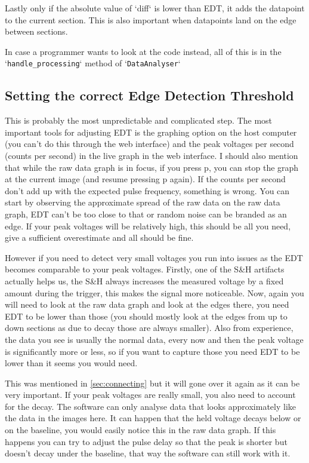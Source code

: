 \documentclass[a4paper, 10pt]{article}
\begin{document}
Lastly only if the absolute value of `diff` is lower than EDT, it adds the datapoint to the current section.
This is also important when datapoints land on the edge between sections.

In case a programmer wants to look at the code instead, all of this is in the `\lstinline{handle_processing}` method of `\lstinline{DataAnalyser}`

\subsection{Setting the correct Edge Detection Threshold}
This is probably the most unpredictable and complicated step.
The most important tools for adjusting EDT is the graphing option on the host computer (you can't do this through the web interface) and the peak voltages per second (counts per second) in the live graph in the web interface.
I should also mention that while the raw data graph is in focus, if you press p, you can stop the graph at the current image (and resume pressing p again).
If the counts per second don't add up with the expected pulse frequency, something is wrong.
You can start by observing the approximate spread of the raw data on the raw data graph, EDT can't be too close to that or random noise can be branded as an edge.
If your peak voltages will be relatively high, this should be all you need, give a sufficient overestimate and all should be fine.

However if you need to detect very small voltages you run into issues as the EDT becomes comparable to your peak voltages.
Firstly, one of the S\&H artifacts actually helps us, the S\&H always increases the measured voltage by a fixed amount during the trigger, this makes the signal more noticeable.
Now, again you will need to look at the raw data graph and look at the edges there, you need EDT to be lower than those (you should mostly look at the edges from up to down sections as due to decay those are always smaller).
Also from experience, the data you see is usually the normal data, every now and then the peak voltage is significantly more or less, so if you want to capture those you need EDT to be lower than it seems you would need.

This was mentioned in \cref{sec:connecting} but it will gone over it again as it can be very important.
If your peak voltages are really small, you also need to account for the decay.
The software can only analyse data that looks approximately like the data in the images here.
It can happen that the held voltage decays below or on the baseline, you would easily notice this in the raw data graph.
If this happens you can try to adjust the pulse delay so that the peak is shorter but doesn't decay under the baseline, that way the software can still work with it.
\end{document}
